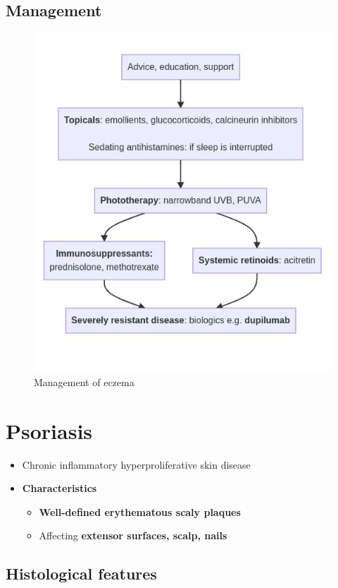 \documentclass[
  12pt,
]{memoir}
\providecommand{\tightlist}{%
  \setlength{\itemsep}{0pt}\setlength{\parskip}{0pt}}
\begin{document}
\hypertarget{management-2}{%
\subsection{Management}\label{management-2}}

\begin{figure}[h!]
\centering
\includegraphics[width=.7\textwidth]{../assets/med/eczema.jpg}
\vspace{-10mm}
\caption{Management of eczema}
\end{figure}

\pagebreak

\hypertarget{psoriasis}{%
\section{Psoriasis}\label{psoriasis}}

\begin{itemize}
\tightlist
\item
  Chronic inflammatory hyperproliferative skin disease
\item
  \textbf{Characteristics}

  \begin{itemize}
  \tightlist
  \item
    \textbf{Well-defined erythematous scaly plaques}
  \item
    Affecting \textbf{extensor surfaces, scalp, nails}
  \end{itemize}
\end{itemize}

\hypertarget{histological-features}{%
\subsection{Histological features}\label{histological-features}}
\end{document}
